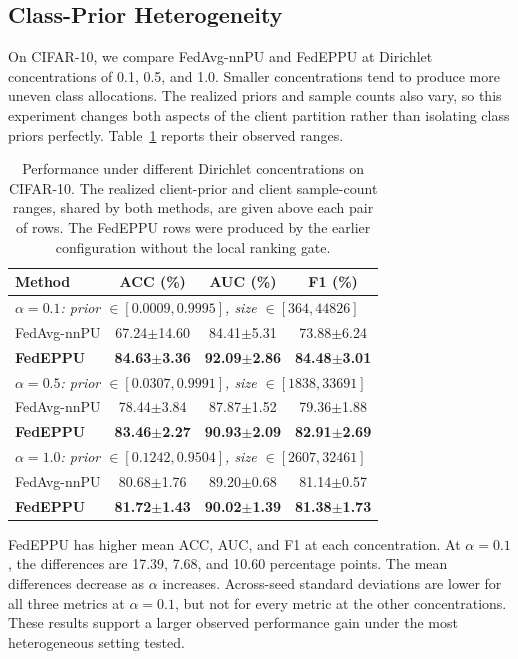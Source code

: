 \documentclass[lettersize,journal]{IEEEtran}
\begin{document}
\subsection{Class-Prior Heterogeneity}
On CIFAR-10, we compare FedAvg-nnPU and FedEPPU at Dirichlet concentrations of 0.1, 0.5, and 1.0. Smaller concentrations tend to produce more uneven class allocations. The realized priors and sample counts also vary, so this experiment changes both aspects of the client partition rather than isolating class priors perfectly. Table~\ref{tab:prior_heterogeneity} reports their observed ranges.

\begin{table}[!t]
\centering
\caption{Performance under different Dirichlet concentrations on CIFAR-10. The realized client-prior and client sample-count ranges, shared by both methods, are given above each pair of rows. The FedEPPU rows were produced by the earlier configuration without the local ranking gate.}
\label{tab:prior_heterogeneity}
\scriptsize
\setlength{\tabcolsep}{4pt}
\begin{tabular}{lccc}
\toprule
Method & ACC (\%) & AUC (\%) & F1 (\%) \\
\midrule
\multicolumn{4}{l}{\textit{$\alpha=0.1$: prior $\in[0.0009,0.9995]$, size $\in[364,44826]$}} \\
FedAvg-nnPU & 67.24$\pm$14.60 & 84.41$\pm$5.31 & 73.88$\pm$6.24 \\
\textbf{FedEPPU} & \textbf{84.63$\pm$3.36} & \textbf{92.09$\pm$2.86} & \textbf{84.48$\pm$3.01} \\
\midrule
\multicolumn{4}{l}{\textit{$\alpha=0.5$: prior $\in[0.0307,0.9991]$, size $\in[1838,33691]$}} \\
FedAvg-nnPU & 78.44$\pm$3.84 & 87.87$\pm$1.52 & 79.36$\pm$1.88 \\
\textbf{FedEPPU} & \textbf{83.46$\pm$2.27} & \textbf{90.93$\pm$2.09} & \textbf{82.91$\pm$2.69} \\
\midrule
\multicolumn{4}{l}{\textit{$\alpha=1.0$: prior $\in[0.1242,0.9504]$, size $\in[2607,32461]$}} \\
FedAvg-nnPU & 80.68$\pm$1.76 & 89.20$\pm$0.68 & 81.14$\pm$0.57 \\
\textbf{FedEPPU} & \textbf{81.72$\pm$1.43} & \textbf{90.02$\pm$1.39} & \textbf{81.38$\pm$1.73} \\
\bottomrule
\end{tabular}
\end{table}

FedEPPU has higher mean ACC, AUC, and F1 at each concentration. At $\alpha=0.1$, the differences are 17.39, 7.68, and 10.60 percentage points. The mean differences decrease as $\alpha$ increases. Across-seed standard deviations are lower for all three metrics at $\alpha=0.1$, but not for every metric at the other concentrations. These results support a larger observed performance gain under the most heterogeneous setting tested.
\end{document}
